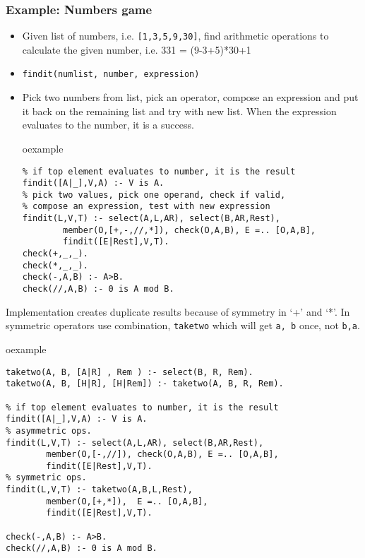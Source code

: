 \begin{frame}[fragile]
\frametitle{Example: Numbers game}
\small
\begin{itemize}
\item Given list of numbers, i.e. \texttt{[1,3,5,9,30]}, find arithmetic operations to calculate the given number, i.e. 331 = (9-3+5)*30+1
\item \lstinline!findit(numlist, number, expression)!
\item Pick two numbers from list, pick an operator, compose an expression and put it
back on  the remaining list and try with new list. When the expression evaluates to the number, it is a success.\\
\begin{beamercolorbox}{oexample}
\begin{lstlisting}
% if top element evaluates to number, it is the result
findit([A|_],V,A) :- V is A. 
% pick two values, pick one operand, check if valid,
% compose an expression, test with new expression
findit(L,V,T) :- select(A,L,AR), select(B,AR,Rest),
        member(O,[+,-,//,*]), check(O,A,B), E =.. [O,A,B],
        findit([E|Rest],V,T).
check(+,_,_).
check(*,_,_).
check(-,A,B) :- A>B.
check(//,A,B) :- 0 is A mod B.
\end{lstlisting}
\end{beamercolorbox}
\end{itemize}
\end{frame}

\begin{frame}[fragile]
\small
Implementation creates duplicate results because of symmetry in `+' and `*'.
In symmetric operators use combination, \lstinline!taketwo! which will get
 \lstinline!a, b!  once, not \lstinline!b,a!.
\begin{beamercolorbox}{oexample}
\begin{lstlisting}
taketwo(A, B, [A|R] , Rem ) :- select(B, R, Rem). 
taketwo(A, B, [H|R], [H|Rem]) :- taketwo(A, B, R, Rem).

% if top element evaluates to number, it is the result
findit([A|_],V,A) :- V is A. 
% asymmetric ops.
findit(L,V,T) :- select(A,L,AR), select(B,AR,Rest),
        member(O,[-,//]), check(O,A,B), E =.. [O,A,B],
        findit([E|Rest],V,T).
% symmetric ops.
findit(L,V,T) :- taketwo(A,B,L,Rest),
        member(O,[+,*]),  E =.. [O,A,B],
        findit([E|Rest],V,T).

check(-,A,B) :- A>B.
check(//,A,B) :- 0 is A mod B.
\end{lstlisting}
\end{beamercolorbox}
\end{frame}

